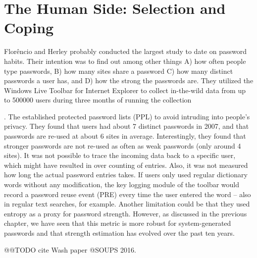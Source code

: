 \chapter[The Human Side: Selecting and Coping]{The Human Side: Selection and Coping}\label{chap:selection_coping_strategies}


Flor\^{e}ncio and Herley probably conducted the largest study to date on password habits. Their intention was to find out among other things A) how often people type passwords, B) how many sites share a password C) how many distinct passwords a user has, and D) how the strong the passwords are. They utilized the Windows Live Toolbar for Internet Explorer to collect in-the-wild data from up to 500000 users during three months of running the collection

\cite{Florencio2007LargeScaleStudyPasswordHabits}. The established protected password lists (PPL) to avoid intruding into people's privacy. They found that users had about 7 distinct passwords in 2007, and that passwords are re-used at about 6 sites in average. Interestingly, they found that stronger passwords are not re-used as often as weak passwords (only around 4 sites). It was not possible to trace the incoming data back to a specific user, which might have resulted in over counting of entries. Also, it was not measured how long the actual password entries takes. If users only used regular dictionary words without any modification, the key logging module of the toolbar would record a password reuse event (PRE) every time the user entered the word -- also in regular text searches, for example. Another limitation could be that they used entropy as a proxy for password strength. However, as discussed in the previous chapter, we have seen that this metric is more robust for system-generated passwords and that strength estimation has evolved over the past ten years. 


@@TODO cite Wash paper @SOUPS 2016.

\cite{Bailey2014StatisticsReuse,Bojinov2010KamouflagePWM,Bonneau2015SecretsLies,Brown2004GeneratingPWs,Chiasson2009InterferencesGraphical,Conklin2004PWAuthenticationSystemPerspective,CSID2012PasswordHabits,Das2014TangledWeb,Dourish2004UserStrategiesEveryday,Florencio2014PasswordPortfoliosFiniteUser,Forget2015CYOA}
\cite{Gaw2005ReuseRecycle,Gaw2006PasswordManagement,Habib2017Blacklists,Haque2014Hierarchy,Hayashi2011DiaryStudyPWs,Huha2015UserReplaceablePasswords,Ives2004DominoEffectReuse,Katsini2017StrategiesGraphicalPasswords,Keith2009PassphraseDesign,Komanduri2011OfPasswordsAndPeople,Kothari2017PasswordLogbooks,Kuo2006HumanSelectionMnemonic,Li2017,Loutfi2015PasswordsOtherSideOfTheFence,Lyastani2016PWMangling,Notoatmodjo2007,Peisert2013PriciplesAuthentication,Riley2006WhatUsersKnowWhatTheyDo}
\cite{Shay2014ReligiousAunt,Shay2010EncounteringPasswordRequirements,Singh2007PasswordSharing,Stobert2014a,Stobert2015,Stobert2014PWMThatDoesntRemember,Stobert2014PasswordLifeCycle,Stobert2015ExpertPassword}
\cite{Ur2015PWCreationLab,Bruggen2013ModifiyngUnlockingBehavior,Veras2012VisualizingSemanticsPasswords,Wang2015ChinesePWs,Wash2016UnderstandingPasswordChoices,Yang2016MnemonicSentenceBased,ZhangKennedy2016RevisitingPasswordRules}

